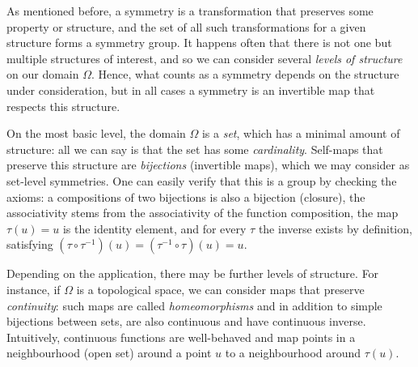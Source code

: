 As mentioned before, a symmetry
is a transformation that preserves some property or structure, and the set of all such transformations for a given structure forms a symmetry group.
It happens often that there is not one but multiple structures of interest, and so we can consider several {\em levels of structure} on our domain $\Omega$. 
%
Hence, what counts as a symmetry depends on the structure under consideration, but in all cases a symmetry is an invertible map that respects this structure.

On the most basic level, the domain $\Omega$ is a \emph{set}, which has a minimal amount of structure: all we can say is that the set has some \emph{cardinality}. %
Self-maps that preserve this structure are  \emph{bijections} (invertible maps), which we may consider as set-level symmetries.
%
One can easily verify that this is a group by checking the axioms: a compositions of two bijections is also a bijection (closure), the associativity stems from the associativity of the function composition, the map $\tau(u)=u$ is the identity element, and for every $\tau$ the inverse exists by definition, satisfying $(\tau \circ \tau^{-1})(u) = (\tau^{-1} \circ \tau)(u) =u$.


Depending on the application, there may be further levels of structure.  
%
For instance, if $\Omega$ is a topological space, we can consider maps that preserve {\em continuity}: such maps are called {\em homeomorphisms} and in addition to simple bijections between sets, are also continuous and have continuous inverse.  
%
Intuitively, continuous functions are well-behaved and map points in a neighbourhood (open set) around a point $u$ to a neighbourhood around $\tau(u)$.  


